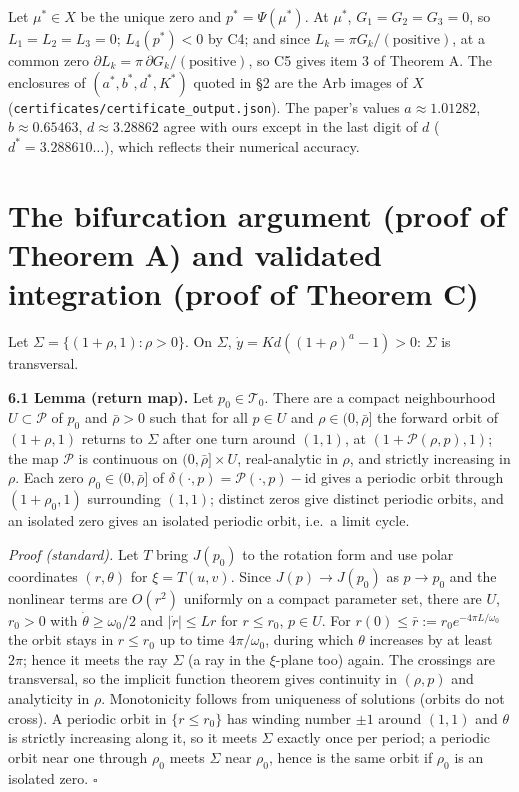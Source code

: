 \documentclass[11pt,a4paper]{report}
\begin{document}
Let \(\mu^*\in X\) be the unique zero and \(p^*=\Psi(\mu^*)\). At \(\mu^*\), \(G_1=G_2=G_3=0\), so
\(L_1=L_2=L_3=0\); \(L_4(p^*)<0\) by C4; and since \(L_k=\pi G_k/(\text{positive})\), at a common zero
\(\partial L_k=\pi\,\partial G_k/(\text{positive})\), so C5 gives item 3 of Theorem A. The enclosures of
\((a^*,b^*,d^*,K^*)\) quoted in §2 are the Arb images of \(X\) (\texttt{certificates/certificate\_output.json}). The
paper's values \(a\approx1.01282\), \(b\approx0.65463\), \(d\approx3.28862\) agree with ours except in the
last digit of \(d\) (\(d^*=3.288610\ldots\)), which reflects their numerical accuracy.

\section{The bifurcation argument (proof of Theorem A) and validated integration (proof of Theorem C)}

Let \(\Sigma=\{(1+\rho,1):\rho>0\}\). On \(\Sigma\), \(\dot y=Kd((1+\rho)^a-1)>0\): \(\Sigma\) is transversal.

\textbf{6.1 Lemma (return map).} Let \(p_0\in\mathcal T_0\). There are a compact neighbourhood \(U\subset\mathcal P\) of
\(p_0\) and \(\bar\rho>0\) such that for all \(p\in U\) and \(\rho\in(0,\bar\rho]\) the forward orbit of
\((1+\rho,1)\) returns to \(\Sigma\) after one turn around \((1,1)\), at \((1+\mathcal P(\rho,p),1)\); the map
\(\mathcal P\) is continuous on \((0,\bar\rho]\times U\), real-analytic in \(\rho\), and strictly increasing in
\(\rho\). Each zero \(\rho_0\in(0,\bar\rho]\) of \(\delta(\cdot,p)=\mathcal P(\cdot,p)-\mathrm{id}\) gives a
periodic orbit through \((1+\rho_0,1)\) surrounding \((1,1)\); distinct zeros give distinct periodic orbits, and an
isolated zero gives an isolated periodic orbit, i.e.~a limit cycle.

\emph{Proof (standard).} Let \(T\) bring \(J(p_0)\) to the rotation form and use polar coordinates \((r,\theta)\) for
\(\xi=T(u,v)\). Since \(J(p)\to J(p_0)\) as \(p\to p_0\) and the nonlinear terms are \(O(r^2)\) uniformly on a
compact parameter set, there are \(U\), \(r_0>0\) with \(\dot\theta\ge\omega_0/2\) and \(|\dot r|\le Lr\) for
\(r\le r_0\), \(p\in U\). For \(r(0)\le\bar r:=r_0e^{-4\pi L/\omega_0}\) the orbit stays in \(r\le r_0\) up to
time \(4\pi/\omega_0\), during which \(\theta\) increases by at least \(2\pi\); hence it meets the ray \(\Sigma\)
(a ray in the \(\xi\)-plane too) again. The crossings are transversal, so the implicit function theorem gives
continuity in \((\rho,p)\) and analyticity in \(\rho\). Monotonicity follows from uniqueness of solutions
(orbits do not cross). A periodic orbit in \(\{r\le r_0\}\) has winding number \(\pm1\) around \((1,1)\) and
\(\theta\) is strictly increasing along it, so it meets \(\Sigma\) exactly once per period; a periodic orbit near
one through \(\rho_0\) meets \(\Sigma\) near \(\rho_0\), hence is the same orbit if \(\rho_0\) is an isolated zero.
\(\square\)
\end{document}
